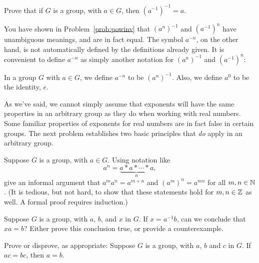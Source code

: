 \begin{problem}
Prove that if \(G\) is a group, with \(a \in G\), then \((a^{-1})^{-1} = a\).
\end{problem}

You have shown in Problem~\ref{prob:powinv} that \((a^n)^{-1}\) and \((a^{-1})^n\) have unambiguous meanings, and are in fact equal. The symbol \(a^{-n}\), on the other hand, is not automatically defined by the definitions already given. It is convenient to define \(a^{-n}\) as simply another notation for \((a^n)^{-1}\) and \((a^{-1})^n\):

\begin{definition}
 In a group \(G\) with \(a \in G\), we define \(a^{-n}\) to be \((a^n)^{-1}\). Also, we define \(a^0\) to be the identity, \(e\).
\end{definition}

As we've said, we cannot simply assume that exponents will have the same properties in an arbitrary group as they do when working with real numbers. Some familiar properties of exponents for real numbers are in fact false in certain groups. The next problem establishes two basic principles that \emph{do} apply in an arbitrary group.

\begin{problem}\label{prob:exprules}
Suppose \(G\) is a group, with \(a \in G\). Using notation like \[a^n = \underbrace{a * a * \cdots * a}_n, \] give an informal argument  that \(a^ma^n = a^{m+n}\) and \((a^m)^n = a^{mn}\) for all \(m, n \in \mathbb{N}\). (It is tedious, but not hard, to show that these statements hold for $m,n\in\mathbb{Z}$ as well. A formal proof requires induction.)
\end{problem}

\begin{problem}
Suppose \(G\) is a group, with \(a\), \(b\), and \(x\) in \(G\). If \(x=a^{-1}b\), can we conclude that \(xa = b\)? Either prove this conclusion true, or provide a counterexample.
\end{problem}

\begin{problem}\label{prob:cancellation}
Prove or disprove, as appropriate: Suppose \(G\) is a group, with \(a\), \(b\) and \(c\) in \(G\). If \(ac = bc\), then \(a = b\).
\begin{annotation}
\end{annotation}
\end{problem}

